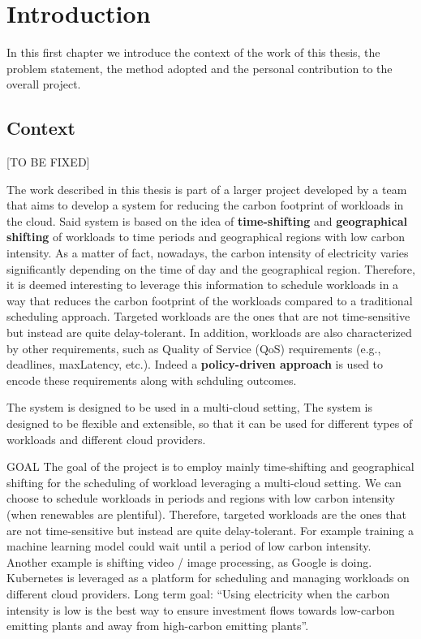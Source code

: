 \chapter{Introduction}
\label{cha:introduction}

In this first chapter we introduce the context of the work of this thesis, the problem statement, the method adopted and the personal contribution to the overall project.

\section{Context}
\label{sec:context}

[TO BE FIXED] \newline

The work described in this thesis is part of a larger project developed by a team
that aims to develop a system for reducing the carbon footprint of workloads in the cloud. 
Said system is based on the idea of \textbf{time-shifting} and \textbf{geographical shifting} of workloads to time periods and geographical regions with low carbon intensity.
As a matter of fact, nowadays, the carbon intensity of electricity varies significantly depending on the time of day and the geographical region.
Therefore, it is deemed interesting to leverage this information to schedule workloads in a way that reduces the carbon footprint of the workloads compared to a traditional scheduling approach.
Targeted workloads are the ones that are not time-sensitive but instead are quite delay-tolerant. 
In addition, workloads are also characterized by other requirements, such as Quality of Service (QoS) requirements (e.g., deadlines, maxLatency, etc.).
Indeed a \textbf{policy-driven approach} is used to encode these requirements along with schduling outcomes.


The system is designed to be used in a multi-cloud setting, 
The system is designed to be flexible and extensible, so that it can be used for different types of workloads and different cloud providers.

GOAL
The goal of the project is to employ mainly time-shifting and geographical shifting for the scheduling of workload leveraging a multi-cloud setting.
We can choose to schedule workloads in periods and regions with low carbon intensity (when renewables are plentiful). 
Therefore, targeted workloads are the ones that are not time-sensitive but instead are quite delay-tolerant. For example training a machine learning model could wait until a period of low carbon intensity. Another example is shifting video / image processing, as Google is doing.
Kubernetes is leveraged as a platform for scheduling and managing workloads on different cloud providers.
Long term goal: “Using electricity when the carbon intensity is low is the best way to ensure investment flows towards low-carbon emitting plants and away from high-carbon emitting plants”.

